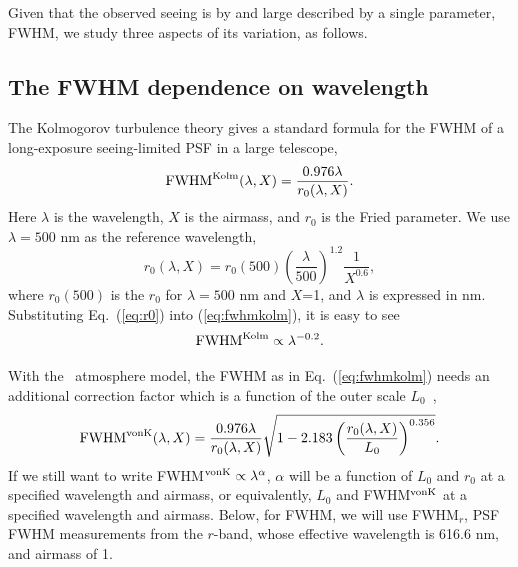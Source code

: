

Given that the observed seeing is by and large described by a single parameter, FWHM, 
we study three aspects of its variation, as follows.


\subsection{The FWHM dependence on wavelength} 

The Kolmogorov turbulence theory gives a standard formula for the FWHM of a long-exposure
seeing-limited PSF in a large telescope,
\begin{equation}
\textrm{FWHM}^{\rm Kolm}(\lambda, X) = \frac{0.976\lambda}{r_0(\lambda,X)}.
\label{eq:fwhmkolm}
\end{equation}
Here $\lambda$ is the wavelength, $X$ is the airmass, and $r_0$ is the Fried parameter.
We use $\lambda = 500$ nm as the reference wavelength,
\begin{equation}
r_0(\lambda,X) = r_0(500) \left(\frac{\lambda}{500}\right)^{1.2}
\frac{1}{X^{0.6}},
\label{eq:r0}
\end{equation}
where $r_0(500)$ is the $r_0$ for $\lambda=500$ nm and $X$=1, and $\lambda$ is 
expressed in nm.
Substituting Eq.~(\ref{eq:r0}) into (\ref{eq:fwhmkolm}), it is easy to see
\begin{equation}
\textrm{FWHM}^{\rm Kolm} \propto \lambda^{-0.2}.
\end{equation}


With the \vk~atmosphere model, the FWHM as in
Eq.~(\ref{eq:fwhmkolm}) needs an additional correction factor
which is a function of the outer scale $L_0$~\citep{Tokovinin2002},
\begin{equation}
\textrm{FWHM}^{\rm vonK}(\lambda, X) = \frac{0.976\lambda}{r_0(\lambda,X)}
\sqrt{1-2.183\left( \frac{r_0(\lambda,X) }{L_0} \right)^{0.356}}.
\end{equation}
If we still want to write FWHM$^{\rm vonK} \propto \lambda^{\alpha} $, 
$\alpha$ will be a function of $L_0$ and $r_0$ at a specified
wavelength and airmass, or equivalently, $L_0$ and FWHM$^{\rm vonK}$ at a
specified wavelength and airmass. Below, for FWHM, we will use FWHM$_r$,
PSF FWHM measurements from the 
$r$-band,
whose effective wavelength is 616.6 nm, and airmass of 1.

